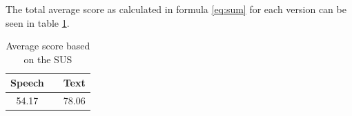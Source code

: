 The total average score as calculated in formula \ref{eq:sum} for each version can be seen in table \ref{tot_score}.
\begin{table}[h!]
  \centering
  \begin{tabular}{ccc}
    \toprule
    Speech &   & Text\\
    \midrule
    54.17 &   & 78.06\\
    \bottomrule
  \end{tabular}
  \caption{Average score based on the SUS}\label{tot_score}
\end{table}